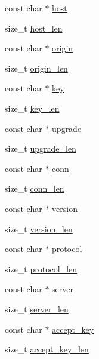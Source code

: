 \begin{DoxyCompactItemize}
const char $\ast$ \hyperlink{structnn__ws__handshake_a6e149d454f1591b67a2e8f3c473a8544}{host}
\item 
size\+\_\+t \hyperlink{structnn__ws__handshake_a3fcda23dfc0cbfb4735e98641550994c}{host\+\_\+len}
\item 
const char $\ast$ \hyperlink{structnn__ws__handshake_a5c331996ce021b6ea02a7b200a5df48d}{origin}
\item 
size\+\_\+t \hyperlink{structnn__ws__handshake_abf46ff8c803a47842c664d190231a71f}{origin\+\_\+len}
\item 
const char $\ast$ \hyperlink{structnn__ws__handshake_a813b1dff0fd69dcd24e3fc3d7192c264}{key}
\item 
size\+\_\+t \hyperlink{structnn__ws__handshake_acb2918c6c1c39d65226c5ba4b7c465c1}{key\+\_\+len}
\item 
const char $\ast$ \hyperlink{structnn__ws__handshake_adf65e6d5c2c1b72c6ef7e866946ace1e}{upgrade}
\item 
size\+\_\+t \hyperlink{structnn__ws__handshake_a97b63de5debf69884b865c0f43ea246c}{upgrade\+\_\+len}
\item 
const char $\ast$ \hyperlink{structnn__ws__handshake_a39e9cea471ac3688cc9911c763328205}{conn}
\item 
size\+\_\+t \hyperlink{structnn__ws__handshake_a269c67abfd22c22f4a9574fe6385f085}{conn\+\_\+len}
\item 
const char $\ast$ \hyperlink{structnn__ws__handshake_a48a9a5ca67775c6a84e470550a0a2693}{version}
\item 
size\+\_\+t \hyperlink{structnn__ws__handshake_a03669e42c930987c0b22fb800a8bb99f}{version\+\_\+len}
\item 
const char $\ast$ \hyperlink{structnn__ws__handshake_ad5fe69ee577cb19eba0750c7bf22bc3b}{protocol}
\item 
size\+\_\+t \hyperlink{structnn__ws__handshake_a732ca68ff4d0194fee2bee4976107f22}{protocol\+\_\+len}
\item 
const char $\ast$ \hyperlink{structnn__ws__handshake_ac7abcd6b36ed3b067c85dc1befed1276}{server}
\item 
size\+\_\+t \hyperlink{structnn__ws__handshake_a591115fd65e49df25abd07502ccdeee6}{server\+\_\+len}
\item 
const char $\ast$ \hyperlink{structnn__ws__handshake_a232c6eea32e0d68c40af288537aa71f8}{accept\+\_\+key}
\item 
size\+\_\+t \hyperlink{structnn__ws__handshake_ae4b845cff494c6c1fb5884f8ed3ebd8c}{accept\+\_\+key\+\_\+len}
\item 

\end{DoxyCompactItemize}
